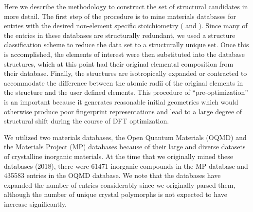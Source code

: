 %
Here we describe the methodology to construct the set of structural candidates in more detail.
%
The first step of the procedure is to mine materials databases for entries with the desired non-element specific stoichiometry ( \ABtwo and \ABthree).
%
Since many of the entries in these databases are structurally redundant,
we used a structure classification scheme to reduce the data set to a structurally unique set.
%
Once this is accomplished, the elements of interest were then substituted into the database structures,
which at this point had their original elemental composition from their database.
%
Finally, the structures are isotropically expanded or contracted to accommodate the difference between the atomic radii of the original elements in the structure and the user defined elements.
%
This procedure of ``pre-optimization'' is an important because it generates reasonable initial geometries which would otherwise produce poor fingerprint representations and lead to a large degree of structural shift during the course of DFT optimization.


%
We utilized two materials databases, the Open Quantum Materials (OQMD) and the Materials Project (MP) databases because of their large and diverse datasets of crystalline inorganic materials.
%
At the time that we originally mined these databases (2018), there were \num{61471} inorganic compounds in the MP database and \num{435583} entries in the OQMD database.
%
We note that the databases have expanded the number of entries considerably since we originally parsed them,
although the number of unique crystal polymorphs is not expected to have increase significantly.


